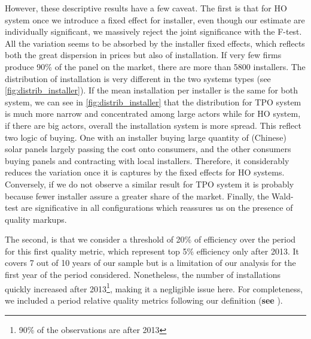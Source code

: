 However, these descriptive results have a few caveat. The first is that for HO system once we introduce a fixed effect for installer, even though our estimate are individually significant, we massively reject the joint significance with the F-test. All the variation seems to be absorbed by the installer fixed effects, which reflects both the great dispersion in prices but also of installation. If very few firms produce 90\% of the panel on the market, there are more than 5800 installers. The distribution of installation is very different in the two systems types (see \autoref{fig:distrib_installer}). If the mean installation per installer is the same for both system, we can see in \autoref{fig:distrib_installer} that the distribution for TPO system is much more narrow and concentrated among large actors while for HO system, if there are big actors, overall the installation system is more spread. This reflect two logic of buying. One with an installer buying large quantity of (Chinese) solar panels largely passing the cost onto consumers, and the other consumers buying panels and contracting with local installers. Therefore, it considerably reduces the variation once it is captures by the fixed effects for HO systems. Conversely, if we do not observe a similar result for TPO system it is probably because fewer installer assure a greater share of the market. Finally, the Wald-test are significative in all configurations which reassures us on the presence of quality markups.

The second, is that we consider a threshold of 20\% of efficiency over the period for this first quality metric, which represent top 5\% efficiency only after 2013. It covers 7 out of 10 years of our sample but is a limitation of our analysis for the first year of the period considered. Nonetheless, the number of installations quickly increased after 2013\footnote{90\% of the observations are after 2013}, making it a negligible issue here. For completeness, we included a period relative quality metrics following our definition (\textbf{see} ).

\begin{table}[H]
    \centering
    \caption{Price response to premium installations for HO and TPO systems}
    
    \label{tab:price_quality_2}
\end{table}

